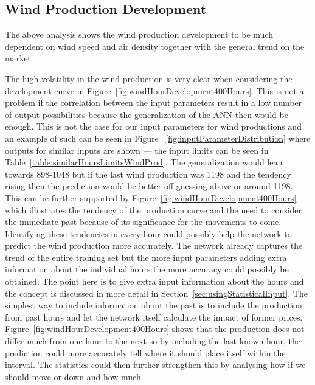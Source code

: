 \subsection{Wind Production Development}
\label{sec:windProductionDev}
The above analysis shows the wind production development to be much dependent on wind speed and air density together with the general trend on the market. 

The high volatility in the wind production is very clear when considering the development curve in Figure~\ref{fig:windHourDevelopment400Hours}. This is not a problem if the correlation between the input parameters result in a low number of output possibilities because the generalization of the ANN then would be enough. This is not the case for our input parameters for wind productions and an example of such can be seen in Figure ~\ref{fig:inputParameterDistribution} where outputs for similar inputs are shown --- the input limits can be seen in Table~\ref{table:similarHoursLimitsWindProd}. The generalization would lean towards 898-1048 but if the last wind production was 1198 and the tendency rising then the prediction would be better off guessing above or around 1198. This can be further supported by Figure~\ref{fig:windHourDevelopment400Hours} which illustrates the tendency of the production curve and the need to consider the immediate past because of its significance for the movements to come. Identifying these tendencies in every hour could possibly help the network to predict the wind production more accurately. The network already captures the trend of the entire training set but the more input parameters adding extra information about the individual hours the more accuracy could possibly be obtained. The point here is to give extra input information about the hours and the concept is discussed in more detail in Section~\ref{sec:usingStatisticalInput}. The simplest way to include information about the past is to include the production from past hours and let the network itself calculate the impact of former prices. Figure~\ref{fig:windHourDevelopment400Hours} shows that the production does not differ much from one hour to the next so by including the last known hour, the prediction could more accurately tell where it should place itself within the interval. The statistics could then further strengthen this by analysing how if we should move or down and how much.

